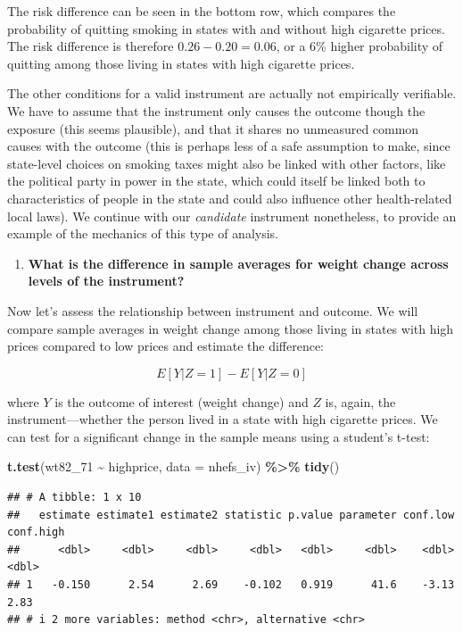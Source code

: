 \documentclass[
]{book}
\newenvironment{Shaded}{\begin{snugshade}}{\end{snugshade}}
\newcommand{\AttributeTok}[1]{\textcolor[rgb]{0.13,0.29,0.53}{#1}}
\newcommand{\FunctionTok}[1]{\textcolor[rgb]{0.13,0.29,0.53}{\textbf{#1}}}
\newcommand{\NormalTok}[1]{#1}
\newcommand{\SpecialCharTok}[1]{\textcolor[rgb]{0.81,0.36,0.00}{\textbf{#1}}}
\providecommand{\tightlist}{%
  \setlength{\itemsep}{0pt}\setlength{\parskip}{0pt}}
\begin{document}
The risk difference can be seen in the bottom row, which compares the probability of quitting smoking in states with and without high cigarette prices. The risk difference is therefore \(0.26 - 0.20 = 0.06\), or a 6\% higher probability of quitting among those living in states with high cigarette prices.

The other conditions for a valid instrument are actually not empirically verifiable. We have to assume that the instrument only causes the outcome though the exposure (this seems plausible), and that it shares no unmeasured common causes with the outcome (this is perhaps less of a safe assumption to make, since state-level choices on smoking taxes might also be linked with other factors, like the political party in power in the state, which could itself be linked both to characteristics of people in the state and could also influence other health-related local laws). We continue with our \emph{candidate} instrument nonetheless, to provide an example of the mechanics of this type of analysis.

\begin{enumerate}
\def\labelenumi{\arabic{enumi}.}
\setcounter{enumi}{1}
\tightlist
\item
  \textbf{What is the difference in sample averages for weight change across levels of the instrument?}
\end{enumerate}

Now let's assess the relationship between instrument and outcome. We will compare sample averages in weight change among those living in states with high prices compared to low prices and estimate the difference:

\[
E[Y|Z=1] - E[Y|Z=0]
\]

where \(Y\) is the outcome of interest (weight change) and \(Z\) is, again, the instrument---whether the person lived in a state with high cigarette prices. We can test for a significant change in the sample means using a student's t-test:

\begin{Shaded}
\begin{Highlighting}[]
\FunctionTok{t.test}\NormalTok{(wt82\_71 }\SpecialCharTok{\textasciitilde{}}\NormalTok{ highprice, }\AttributeTok{data =}\NormalTok{ nhefs\_iv) }\SpecialCharTok{\%\textgreater{}\%} 
  \FunctionTok{tidy}\NormalTok{()}
\end{Highlighting}
\end{Shaded}

\begin{verbatim}
## # A tibble: 1 x 10
##   estimate estimate1 estimate2 statistic p.value parameter conf.low conf.high
##      <dbl>     <dbl>     <dbl>     <dbl>   <dbl>     <dbl>    <dbl>     <dbl>
## 1   -0.150      2.54      2.69    -0.102   0.919      41.6    -3.13      2.83
## # i 2 more variables: method <chr>, alternative <chr>
\end{verbatim}
\end{document}
